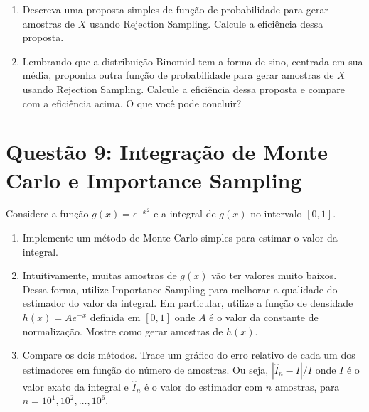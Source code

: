 \documentclass[12 pt]{article}
\begin{document}
\begin{enumerate}
    \item Descreva uma proposta simples de função de probabilidade para gerar amostras de $X$ usando Rejection Sampling. Calcule a eficiência dessa proposta.
    \begin{tcolorbox}[colframe=black, title=Resposta:]

    \end{tcolorbox}
    \item Lembrando que a distribuição Binomial tem a forma de sino, centrada em sua média, proponha outra função de probabilidade para gerar amostras de $X$ usando Rejection Sampling. Calcule a eficiência dessa proposta e compare com a eficiência acima. O que você pode concluir?
    \begin{tcolorbox}[colframe=black, title=Resposta:]

    \end{tcolorbox}
\end{enumerate}

\section*{Questão 9: Integração de Monte Carlo e Importance Sampling}

Considere a função $g(x) = e^{-x^2}$ e a integral de $g(x)$ no intervalo $[0, 1]$.

\begin{enumerate}
    \item Implemente um método de Monte Carlo simples para estimar o valor da integral.
    \begin{tcolorbox}[colframe=black, title=Resposta:]

    \end{tcolorbox}
    \item Intuitivamente, muitas amostras de $g(x)$ vão ter valores muito baixos. Dessa forma, utilize Importance Sampling para melhorar a qualidade do estimador do valor da integral. Em particular, utilize a função de densidade $h(x) = Ae^{-x}$ definida em $[0, 1]$ onde $A$ é o valor da constante de normalização. Mostre como gerar amostras de $h(x)$.
    \begin{tcolorbox}[colframe=black, title=Resposta:]

    \end{tcolorbox}
    \item Compare os dois métodos. Trace um gráfico do erro relativo de cada um dos estimadores em função do número de amostras. Ou seja, $|\hat{I}_n - I|/I$ onde $I$ é o valor exato da integral e $\hat{I}_n$ é o valor do estimador com $n$ amostras, para $n = 10^1, 10^2, \dots, 10^6$.
    \begin{tcolorbox}[colframe=black, title=Resposta:]

    \end{tcolorbox}
\end{enumerate}
\end{document}
